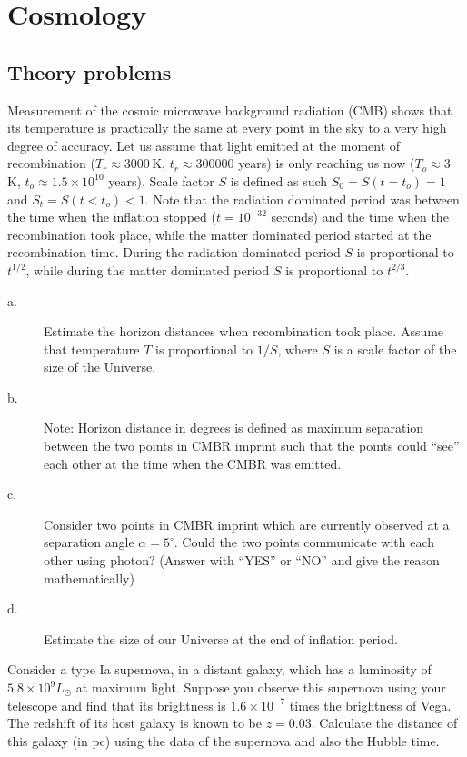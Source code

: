 \chapter{Cosmology}

\section*{Theory problems}

Measurement of the cosmic microwave background radiation (CMB) shows that its
temperature is practically the same at every point in the sky to a very high
degree of accuracy. Let us assume that light emitted at the moment of
recombination ($T_r \approx 3000$\,K, $t_r \approx 300000$ years) is only
reaching us now ($T_o \approx 3$\,K, $t_o \approx 1.5 \times 10^{10}$ years).
Scale factor $S$ is defined as such $S_0 = S(t = t_o) = 1$ and
$S_t = S(t < t_o) < 1$. Note that the radiation dominated period was between
the time when the inflation stopped ($t = 10^{-32}$ seconds) and the time when
the recombination took place, while the matter dominated period started at the
recombination time. During the radiation dominated period $S$ is proportional
to $t^{1/2}$, while during the matter dominated period $S$ is proportional to
$t^{2/3}$.

\begin{description}
\item[a.] Estimate the horizon distances when recombination took place. Assume
  that temperature $T$ is proportional to $1/S$, where $S$ is a scale factor
  of the size of the Universe.
\item[b.] Note: Horizon distance in degrees is defined as maximum separation
  between the two points in CMBR imprint such that the points could ``see''
  each other at the time when the CMBR was emitted.
\item[c.] Consider two points in CMBR imprint which are currently observed at
  a separation angle $\alpha = 5^\circ$. Could the two points communicate with
  each other using photon? (Answer with ``YES'' or ``NO'' and give the reason
  mathematically)
\item[d.] Estimate the size of our Universe at the end of inflation period.
\end{description}

Consider a type Ia supernova, in a distant galaxy, which has a luminosity of
$5.8 \times 10^{9}L_\odot$ at maximum light. Suppose you observe this
supernova using your telescope and find that its brightness is
$1.6 \times 10^{-7}$ times the brightness of Vega. The redshift of its host
galaxy is known to be $z = 0.03$. Calculate the distance of this galaxy (in
pc) using the data of the supernova and also the Hubble time.

